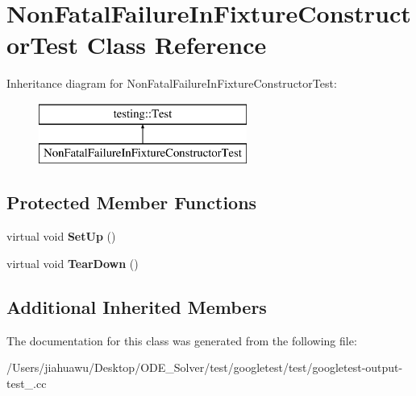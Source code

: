 \hypertarget{class_non_fatal_failure_in_fixture_constructor_test}{}\section{Non\+Fatal\+Failure\+In\+Fixture\+Constructor\+Test Class Reference}
\label{class_non_fatal_failure_in_fixture_constructor_test}
Inheritance diagram for Non\+Fatal\+Failure\+In\+Fixture\+Constructor\+Test\+:\begin{figure}[H]
\begin{center}
\leavevmode
\includegraphics[height=2.000000cm]{class_non_fatal_failure_in_fixture_constructor_test}
\end{center}
\end{figure}
\subsection*{Protected Member Functions}
\begin{DoxyCompactItemize}
\item 
\mbox{\label{class_non_fatal_failure_in_fixture_constructor_test_a7d951f8fbf7b2ac5046be8d8ee7b03d3}} 
virtual void {\bfseries Set\+Up} ()
\item 
\mbox{\label{class_non_fatal_failure_in_fixture_constructor_test_ab76d79c346d9a378d625fde5739e8ad6}} 
virtual void {\bfseries Tear\+Down} ()
\end{DoxyCompactItemize}
\subsection*{Additional Inherited Members}


The documentation for this class was generated from the following file\+:\begin{DoxyCompactItemize}
\item 
/\+Users/jiahuawu/\+Desktop/\+O\+D\+E\+\_\+\+Solver/test/googletest/test/googletest-\/output-\/test\+\_\+.\+cc\end{DoxyCompactItemize}
